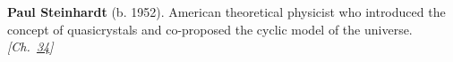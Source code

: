 \textbf{Paul Steinhardt} (b. 1952). American theoretical physicist who introduced the concept of quasicrystals and co-proposed the cyclic model of the universe. \emph{[Ch.~\hyperref[ch:boltzmannbrain]{34}]}

